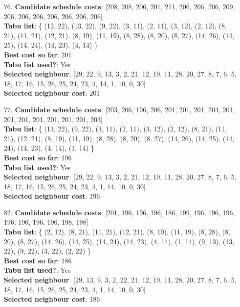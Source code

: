 \documentclass[fleqn]{article}
\begin{document}
\begin{itemize}
    \item[76.] \textbf{Candidate schedule costs}: [208, 208, 206, 201, 211, 206, 206, 206, 209, 206, 206, 206, 206, 206, 206, 206] \\
    \textbf{Tabu list}: \{ (12, 22), (13, 22), (9, 22), (3, 11), (2, 11), (3, 12), (2, 12), (8, 21), (11, 21), (12, 21), (8, 19), (11, 19), (8, 28), (8, 20), (8, 27), (14, 26), (14, 25), (14, 24), (14, 23), (4, 14) \} \\
    \textbf{Best cost so far}: 201 \\
    \textbf{Tabu list used?}: Yes \\
    \textbf{Selected neighbour}: [29, 22, 9, 13, 3, 2, 21, 12, 19, 11, 28, 20, 27, 8, 7, 6, 5, 18, 17, 16, 15, 26, 25, 24, 23, 4, 14, 1, 10, 0, 30] \\
    \textbf{Selected neighbour cost}: 201
      

    \item[77.] \textbf{Candidate schedule costs}: [203, 206, 196, 206, 201, 201, 201, 204, 201, 201, 201, 201, 201, 201, 201, 203] \\
    \textbf{Tabu list}: \{ (13, 22), (9, 22), (3, 11), (2, 11), (3, 12), (2, 12), (8, 21), (11, 21), (12, 21), (8, 19), (11, 19), (8, 28), (8, 20), (8, 27), (14, 26), (14, 25), (14, 24), (14, 23), (4, 14), (1, 14) \} \\
    \textbf{Best cost so far}: 196 \\
    \textbf{Tabu list used?}: Yes \\
    \textbf{Selected neighbour}: [29, 22, 9, 13, 3, 2, 21, 12, 19, 11, 28, 20, 27, 8, 7, 6, 5, 18, 17, 16, 15, 26, 25, 24, 23, 4, 1, 14, 10, 0, 30] \\
    \textbf{Selected neighbour cost}: 196
      

    \item[82.] \textbf{Candidate schedule costs}: [201, 196, 196, 196, 186, 199, 196, 196, 196, 196, 196, 196, 196, 198, 198] \\
    \textbf{Tabu list}: \{ (2, 12), (8, 21), (11, 21), (12, 21), (8, 19), (11, 19), (8, 28), (8, 20), (8, 27), (14, 26), (14, 25), (14, 24), (14, 23), (4, 14), (1, 14), (9, 13), (13, 22), (9, 22), (3, 22), (2, 22) \} \\
    \textbf{Best cost so far}: 186 \\
    \textbf{Tabu list used?}: Yes \\
    \textbf{Selected neighbour}: [29, 13, 9, 3, 2, 22, 21, 12, 19, 11, 28, 20, 27, 8, 7, 6, 5, 18, 17, 16, 15, 26, 25, 24, 23, 4, 1, 14, 10, 0, 30] \\
    \textbf{Selected neighbour cost}: 186
      


\end{itemize}
\end{document}
